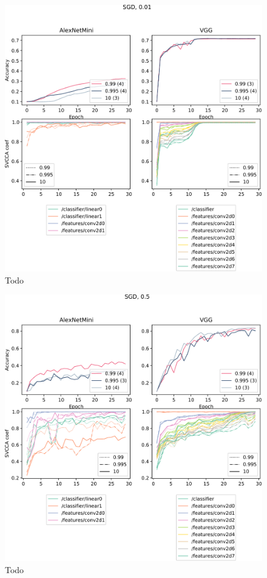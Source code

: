 \begin{figure}
    \centering
    \includegraphics[width=\linewidth]{gfx/diagrams/experiments/saturation/alexnetmini_vgg_sgd_001.pdf}
    \caption{Todo}
    \label{fig:saturation_alexnet_vgg_sgd_001}
\end{figure}
\begin{figure}
    \centering
    \includegraphics[width=\linewidth]{gfx/diagrams/experiments/saturation/alexnetmini_vgg_sgd_05.pdf}
    \caption{Todo}
    \label{fig:saturation_alexnet_vgg_sgd_05}
\end{figure}
